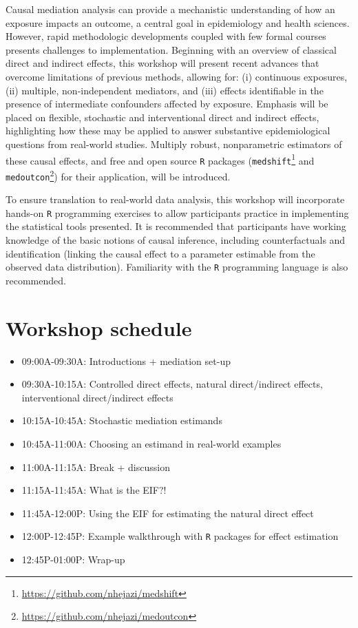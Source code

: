 \documentclass[
  12pt,
]{book}
\newcommand{\passthrough}[1]{#1}
\providecommand{\tightlist}{%
  \setlength{\itemsep}{0pt}\setlength{\parskip}{0pt}}
\renewcommand{\href}[2]{#2\footnote{\url{#1}}}
\theoremstyle{definition}
\theoremstyle{definition}
\theoremstyle{definition}
\newcommand{\1}{\mathbbm{1}}
\begin{document}
Causal mediation analysis can provide a mechanistic understanding of how an
exposure impacts an outcome, a central goal in epidemiology and health sciences.
However, rapid methodologic developments coupled with few formal courses
presents challenges to implementation. Beginning with an overview of classical
direct and indirect effects, this workshop will present recent advances that
overcome limitations of previous methods, allowing for: (i) continuous
exposures, (ii) multiple, non-independent mediators, and (iii) effects
identifiable in the presence of intermediate confounders affected by exposure.
Emphasis will be placed on flexible, stochastic and interventional direct and
indirect effects, highlighting how these may be applied to answer substantive
epidemiological questions from real-world studies. Multiply robust,
nonparametric estimators of these causal effects, and free and open source \passthrough{\lstinline!R!}
packages (\href{https://github.com/nhejazi/medshift}{\passthrough{\lstinline!medshift!}} and
\href{https://github.com/nhejazi/medoutcon}{\passthrough{\lstinline!medoutcon!}}) for their application, will
be introduced.

To ensure translation to real-world data analysis, this workshop will
incorporate hands-on \passthrough{\lstinline!R!} programming exercises to allow participants practice in
implementing the statistical tools presented. It is recommended that
participants have working knowledge of the basic notions of causal inference,
including counterfactuals and identification (linking the causal effect to a
parameter estimable from the observed data distribution). Familiarity with the
\passthrough{\lstinline!R!} programming language is also recommended.

\hypertarget{schedule}{%
\section{Workshop schedule}\label{schedule}}

\begin{itemize}
\tightlist
\item
  09:00A-09:30A: Introductions + mediation set-up
\item
  09:30A-10:15A: Controlled direct effects, natural direct/indirect effects,
  interventional direct/indirect effects
\item
  10:15A-10:45A: Stochastic mediation estimands
\item
  10:45A-11:00A: Choosing an estimand in real-world examples
\item
  11:00A-11:15A: Break + discussion
\item
  11:15A-11:45A: What is the EIF?!
\item
  11:45A-12:00P: Using the EIF for estimating the natural direct effect
\item
  12:00P-12:45P: Example walkthrough with \passthrough{\lstinline!R!} packages for effect estimation
\item
  12:45P-01:00P: Wrap-up
\end{itemize}
\end{document}
